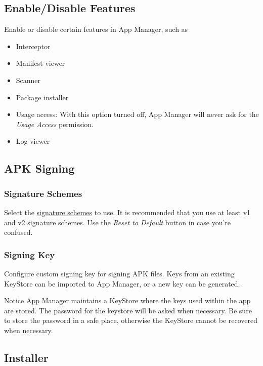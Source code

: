 \subsection{Enable/Disable Features}\label{subsec:enable/disable-features}
Enable or disable certain features in App Manager, such as
\begin{itemize}
    \item Interceptor
    \item Manifest viewer
    \item Scanner
    \item Package installer
    \item Usage access: With this option turned off, App Manager will never ask for the \textit{Usage Access} permission.
    \item Log viewer
\end{itemize}


\subsection{APK Signing}\label{subsec:apk-signing}

\subsubsection{Signature Schemes}
Select the \href{https://source.android.com/security/apksigning}{signature schemes} to use.
It is recommended that you use at least v1 and v2 signature schemes.
Use the \textit{Reset to Default} button in case you're confused.

\subsubsection{Signing Key}
Configure custom signing key for signing APK files.
Keys from an existing KeyStore can be imported to App Manager, or a new key can be generated.

\begin{warning}{Notice}
    App Manager maintains a KeyStore where the keys used within the app are stored.
    The password for the keystore will be asked when necessary.
    Be sure to store the password in a safe place, otherwise the KeyStore cannot be recovered when necessary.
\end{warning}


\subsection{Installer}\label{subsec:installer}


